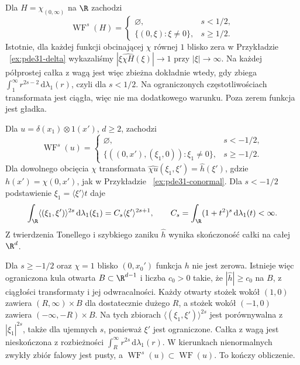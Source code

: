 \begin{przyklad}
\label{ex:pde31-sobolev-heaviside}
Dla $H=\chi_{(0,\infty)}$ na $\R$ zachodzi
\[
 \operatorname{WF}^s(H)=
 \begin{cases}
 \varnothing,&s<1/2,\\
 \{(0,\xi):\xi\ne0\},&s\ge1/2.
 \end{cases}
\]
Istotnie, dla każdej funkcji obcinającej $\chi$
równej $1$ blisko zera w Przykładzie
~\ref{ex:pde31-delta} wykazaliśmy
$|\xi\widehat{\chi H}(\xi)|\to1$ przy
$|\xi|\to\infty$. Na każdej półprostej całka
z wagą jest więc zbieżna dokładnie wtedy,
gdy zbiega $\int_1^\infty r^{2s-2}\,
\mathrm d\lambda_1(r)$, czyli dla $s<1/2$.
Na ograniczonych częstotliwościach transformata
jest ciągła, więc nie ma dodatkowego warunku.
Poza zerem funkcja jest gładka.
\end{przyklad}

\begin{przyklad}
\label{ex:pde31-sobolev-conormal}
Dla $u=\delta(x_1)\otimes1(x')$, $d\ge2$,
zachodzi
\[
 \operatorname{WF}^s(u)=
 \begin{cases}
 \varnothing,&s<-1/2,\\
 \{((0,x'),(\xi_1,0)):\xi_1\ne0\},&s\ge-1/2.
 \end{cases}
\]
Dla dowolnego obcięcia $\chi$ transformata
$\widehat{\chi u}(\xi_1,\xi')=\widehat h(\xi')$,
gdzie $h(x')=\chi(0,x')$, jak w Przykładzie
~\ref{ex:pde31-conormal}.
Dla $s<-1/2$ podstawienie
$\xi_1=\langle\xi'\rangle t$ daje
\[
 \int_{\R}\langle(\xi_1,\xi')\rangle^{2s}
 \,\mathrm d\lambda_1(\xi_1)
 =C_s\langle\xi'\rangle^{2s+1},
 \qquad
 C_s=\int_\R(1+t^2)^s\,\mathrm d\lambda_1(t)<\infty.
\]
Z twierdzenia Tonellego i szybkiego zaniku
$\widehat h$ wynika skończoność całki na całej
$\R^d$.

Dla $s\ge-1/2$ oraz $\chi=1$ blisko $(0,x_0')$
funkcja $h$ nie jest zerowa. Istnieje więc
ograniczona kula otwarta $B\subset\R^{d-1}$
i liczba $c_0>0$ takie, że
$|\widehat h|\ge c_0$ na $B$, z ciągłości
transformaty i jej odwracalności.
Każdy otwarty stożek wokół $(1,0)$ zawiera
$(R,\infty)\times B$ dla dostatecznie dużego $R$,
a stożek wokół $(-1,0)$ zawiera
$(-\infty,-R)\times B$.
Na tych zbiorach
$\langle(\xi_1,\xi')\rangle^{2s}$ jest porównywalna
z $|\xi_1|^{2s}$, także dla ujemnych $s$,
ponieważ $\xi'$ jest ograniczone.
Całka z wagą jest nieskończona z rozbieżności
$\int_R^\infty r^{2s}\,\mathrm d\lambda_1(r)$.
W kierunkach nienormalnych zwykły zbiór falowy
jest pusty, a $\operatorname{WF}^s(u)\subset
\operatorname{WF}(u)$. To kończy obliczenie.
\end{przyklad}

